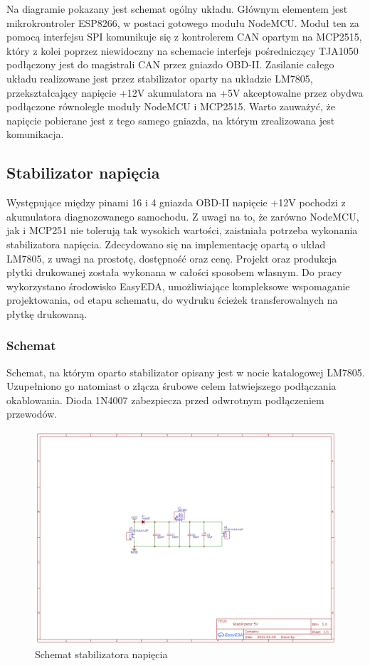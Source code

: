 \documentclass[10pt,a4paper]{article}
\begin{document}
	Na diagramie pokazany jest schemat ogólny układu. Głównym elementem jest mikrokrontroler ESP8266, w postaci gotowego modułu NodeMCU. Moduł ten za pomocą interfejsu SPI komunikuje się z kontrolerem CAN opartym na MCP2515, który z kolei poprzez niewidoczny na schemacie interfejs pośredniczący TJA1050 podłączony jest do magistrali CAN przez gniazdo OBD-II. Zasilanie całego układu realizowane jest przez stabilizator oparty na układzie LM7805, przekształcający napięcie +12V akumulatora na +5V akceptowalne przez obydwa podłączone równolegle moduły NodeMCU i MCP2515. Warto zauważyć, że napięcie pobierane jest z tego samego gniazda, na którym zrealizowana jest komunikacja.
		\subsection{Stabilizator napięcia}
		Występujące między pinami 16 i 4 gniazda OBD-II napięcie +12V pochodzi z akumulatora diagnozowanego samochodu. Z uwagi na to, że zarówno NodeMCU, jak i MCP251 nie tolerują tak wysokich wartości, zaistniała potrzeba wykonania stabilizatora napięcia. Zdecydowano się na implementację opartą o układ LM7805, z uwagi na prostotę, dostępność oraz cenę. Projekt oraz produkcja płytki drukowanej została wykonana w całości sposobem własnym. Do pracy wykorzystano środowisko EasyEDA, umożliwiające kompleksowe wspomaganie projektowania, od etapu schematu, do wydruku ścieżek transferowalnych na płytkę drukowaną.
		\subsubsection{Schemat}
		Schemat, na którym oparto stabilizator opisany jest w nocie katalogowej LM7805. Uzupełniono go natomiast o złącza śrubowe celem łatwiejszego podłączania okablowania. Dioda 1N4007 zabezpiecza przed odwrotnym podłączeniem przewodów.
		\begin{figure}
			\centering
			\includegraphics[width=1.0\linewidth]{schemat_stabilizator}
			\caption{Schemat stabilizatora napięcia}
			\label{fig:schematstabilizator}
		\end{figure}\\
\end{document}
